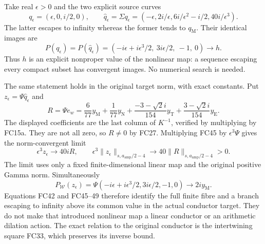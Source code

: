 Take real $\epsilon>0$ and the two explicit source curves
\[
 q_\epsilon=(\epsilon,0,i/2,0),\qquad
 \widehat q_\epsilon=\Sigma q_\epsilon
 =(-\epsilon,2i/\epsilon,6i/\epsilon^2-i/2,40i/\epsilon^3).
 \tag{FC45}
\]
The latter escapes to infinity whereas the former tends to
$q_{\mathrm M}$. Their identical images are
\[
 P(q_\epsilon)=P(\widehat q_\epsilon)
 =(-i\epsilon+i\epsilon^3/2,\ 3i\epsilon/2,\ -1,\ 0)
 \longrightarrow h.
 \tag{FC46}
\]
Thus $h$ is an explicit nonproper value of the nonlinear map: a
sequence escaping every compact subset has convergent images.
No numerical search is needed.

The same statement holds in the original target norm, with exact
constants. Put $z_\epsilon=\Psi\widehat q_\epsilon$ and
\[
 R=\Psi e_w=
 \frac6{77}y_{\mathrm M}+\frac1{77}y_{\mathrm N}
 +\frac{-3-\sqrt2i}{154}y_{\mathrm T}
 +\frac{3-\sqrt2i}{154}y_{\mathrm E}.
 \tag{FC47}
\]
The displayed coefficients are the last column of $K^{-1}$, verified
by multiplying by FC15a. They are not all zero, so $R\ne0$ by FC27.
Multiplying FC45 by $\epsilon^3\Psi$ gives the norm-convergent limit
\[
 \epsilon^3 z_\epsilon\longrightarrow40iR,\qquad
 \epsilon^3\|z_\epsilon\|_{s,a_{\mathrm{amp}}/2-4}
 \longrightarrow40\|R\|_{s,a_{\mathrm{amp}}/2-4}>0.
 \tag{FC48}
\]
The limit uses only a fixed finite-dimensional linear map and the
original positive Gamma norm. Simultaneously
\[
 P_{\mathcal W}(z_\epsilon)
 =\Psi(-i\epsilon+i\epsilon^3/2,3i\epsilon/2,-1,0)
 \longrightarrow2iy_{\mathrm M}.
 \tag{FC49}
\]
Equations FC42 and FC45--49 therefore identify the full finite fibre
and a branch escaping to infinity above its common value in the
actual conductor target. They do not make that introduced nonlinear
map a linear conductor or an arithmetic dilation action. The exact
relation to the original conductor is the intertwining square FC33,
which preserves its inverse bound.

